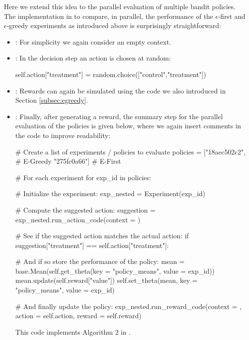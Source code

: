 \documentclass[nojss]{jss}
\begin{document}
Here we extend this idea to the parallel evaluation of multiple bandit policies. The implementation in  to compare, in parallel, the performance of the $\epsilon$-first and $\epsilon$-greedy experiments as introduced above is surprisingly straightforward:
\begin{itemize}
\item {}: For simplicity we again consider an empty context.
\item {}: In the decision step an action is chosen at random:
\begin{Code}
self.action["treatment"] = random.choice(["control","treatment"])
\end{Code}

\item {}: Rewards can again be simulated using the code we also introduced in Section \ref{subsec:egreedy}.
\item {}: Finally, after generating a reward, the summary step for the parallel evaluation of the policies is given below, where we again insert comments in the code to improve readability:
\begin{Code}
# Create a list of experiments / policies to evaluate
policies = ["18aec502c2", # E-Greedy
                 "275fc0a66"] # E-First

# For each experiment
for exp_id in policies:

    # Initialize the experiment:
    exp_nested = Experiment(exp_id)
    
    # Compute the suggested action:
    suggestion = exp_nested.run_action_code(context = {})
    
    # See if the suggested action matches the actual action:
    if suggestion["treatment"] == self.action["treatment"]:
        
        # And if so store the performance of the policy:
        mean = base.Mean(self.get_theta(key = "policy_means", 
        				value = exp_id))
        mean.update(self.reward["value"])
        self.set_theta(mean, key = "policy_means", value = exp_id)
        
        # And finally update the policy:
        exp_nested.run_reward_code(context = {}, 
        		action = self.action, reward = self.reward)
\end{Code}
This code implements Algorithm $2$ in \citep{Li2010a}.
\end{itemize}
\end{document}
